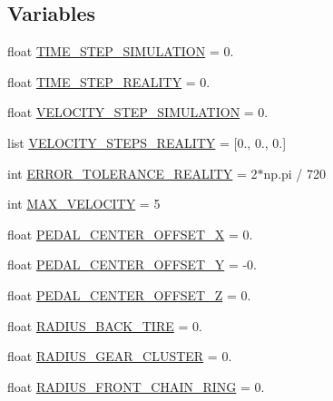 \subsection*{Variables}
\begin{DoxyCompactItemize}
\item 
float \mbox{\hyperlink{namespacevelocity__test_a44f8e7148085952bdc0b8a159c5a3269}{T\+I\+M\+E\+\_\+\+S\+T\+E\+P\+\_\+\+S\+I\+M\+U\+L\+A\+T\+I\+ON}} = 0.
\item 
float \mbox{\hyperlink{namespacevelocity__test_acd9fa0ea415955fa2a0ad6baa33e75ad}{T\+I\+M\+E\+\_\+\+S\+T\+E\+P\+\_\+\+R\+E\+A\+L\+I\+TY}} = 0.
\item 
float \mbox{\hyperlink{namespacevelocity__test_a278cb96dbbe3f30f396827564411fae3}{V\+E\+L\+O\+C\+I\+T\+Y\+\_\+\+S\+T\+E\+P\+\_\+\+S\+I\+M\+U\+L\+A\+T\+I\+ON}} = 0.
\item 
list \mbox{\hyperlink{namespacevelocity__test_a4723db82d376b8404d42425d872a453e}{V\+E\+L\+O\+C\+I\+T\+Y\+\_\+\+S\+T\+E\+P\+S\+\_\+\+R\+E\+A\+L\+I\+TY}} = \mbox{[}0., 0., 0.\mbox{]}
\item 
int \mbox{\hyperlink{namespacevelocity__test_aff3865a893342d83613d51d6a735bffd}{E\+R\+R\+O\+R\+\_\+\+T\+O\+L\+E\+R\+A\+N\+C\+E\+\_\+\+R\+E\+A\+L\+I\+TY}} = 2$\ast$np.\+pi / 720
\item 
int \mbox{\hyperlink{namespacevelocity__test_ad1792a9ca3ac37179a663d41f326e218}{M\+A\+X\+\_\+\+V\+E\+L\+O\+C\+I\+TY}} = 5
\item 
float \mbox{\hyperlink{namespacevelocity__test_ac597badfac305e8b24a84979e5931501}{P\+E\+D\+A\+L\+\_\+\+C\+E\+N\+T\+E\+R\+\_\+\+O\+F\+F\+S\+E\+T\+\_\+X}} = 0.
\item 
float \mbox{\hyperlink{namespacevelocity__test_af63430f1018d64f889e1cf85acbf560f}{P\+E\+D\+A\+L\+\_\+\+C\+E\+N\+T\+E\+R\+\_\+\+O\+F\+F\+S\+E\+T\+\_\+Y}} = -\/0.
\item 
float \mbox{\hyperlink{namespacevelocity__test_a010eece7b21741b6206e8838fa113087}{P\+E\+D\+A\+L\+\_\+\+C\+E\+N\+T\+E\+R\+\_\+\+O\+F\+F\+S\+E\+T\+\_\+Z}} = 0.
\item 
float \mbox{\hyperlink{namespacevelocity__test_acb4d3926b9f53fdc746eb32aba337cae}{R\+A\+D\+I\+U\+S\+\_\+\+B\+A\+C\+K\+\_\+\+T\+I\+RE}} = 0.
\item 
float \mbox{\hyperlink{namespacevelocity__test_a15f4e59795cace3f0a02eba578d141dd}{R\+A\+D\+I\+U\+S\+\_\+\+G\+E\+A\+R\+\_\+\+C\+L\+U\+S\+T\+ER}} = 0.
\item 
float \mbox{\hyperlink{namespacevelocity__test_a36468a70fd64a0876bee48ed094ae1aa}{R\+A\+D\+I\+U\+S\+\_\+\+F\+R\+O\+N\+T\+\_\+\+C\+H\+A\+I\+N\+\_\+\+R\+I\+NG}} = 0.

\end{DoxyCompactItemize}
